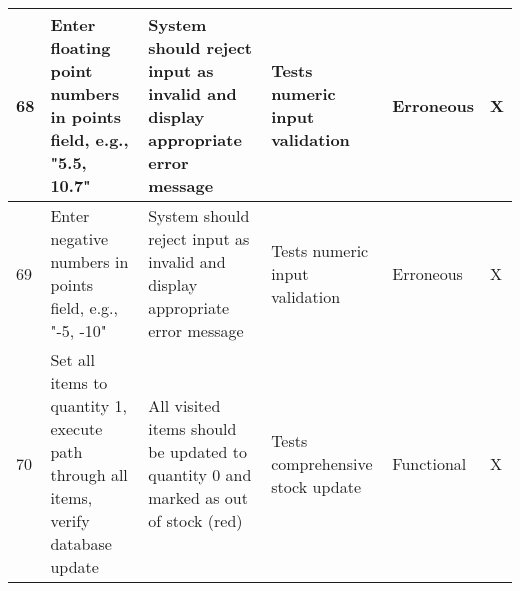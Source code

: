 \begin{longtable}{|p{}|p{}|p{}|p{}|p{}|p{}|}
	\hline
	68 & Enter floating point numbers in points field, e.g., "5.5, 10.7" & System should reject input as invalid and display appropriate error message & Tests numeric input validation & Erroneous & X \\
	\hline
	69 & Enter negative numbers in points field, e.g., "-5, -10" & System should reject input as invalid and display appropriate error message & Tests numeric input validation & Erroneous & X \\
	\hline
	70 & Set all items to quantity 1, execute path through all items, verify database update & All visited items should be updated to quantity 0 and marked as out of stock (red) & Tests comprehensive stock update & Functional & X \\
	\hline
\end{longtable}

